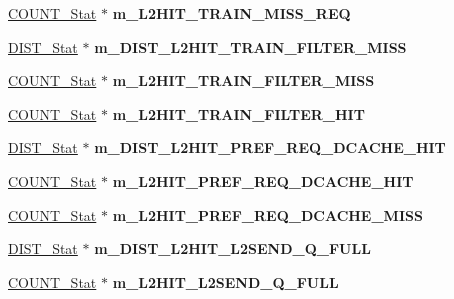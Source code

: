\begin{DoxyCompactItemize}
\item 
\hypertarget{classall__stats__c_a0ab7ad96cf461b0328bba168c20f0e55}{
\hyperlink{classCOUNT__Stat}{COUNT\_\-Stat} $\ast$ {\bfseries m\_\-L2HIT\_\-TRAIN\_\-MISS\_\-REQ}}
\label{classall__stats__c_a0ab7ad96cf461b0328bba168c20f0e55}

\item 
\hypertarget{classall__stats__c_a50313ff7202775c1bbafd9710139e45c}{
\hyperlink{classDIST__Stat}{DIST\_\-Stat} $\ast$ {\bfseries m\_\-DIST\_\-L2HIT\_\-TRAIN\_\-FILTER\_\-MISS}}
\label{classall__stats__c_a50313ff7202775c1bbafd9710139e45c}

\item 
\hypertarget{classall__stats__c_ae0bdb83b1c49fc2e2b6a925e9aaa6a6e}{
\hyperlink{classCOUNT__Stat}{COUNT\_\-Stat} $\ast$ {\bfseries m\_\-L2HIT\_\-TRAIN\_\-FILTER\_\-MISS}}
\label{classall__stats__c_ae0bdb83b1c49fc2e2b6a925e9aaa6a6e}

\item 
\hypertarget{classall__stats__c_af22043895987407b9ff977d757f1f85d}{
\hyperlink{classCOUNT__Stat}{COUNT\_\-Stat} $\ast$ {\bfseries m\_\-L2HIT\_\-TRAIN\_\-FILTER\_\-HIT}}
\label{classall__stats__c_af22043895987407b9ff977d757f1f85d}

\item 
\hypertarget{classall__stats__c_a007f642785b586d3118a0c32601fe599}{
\hyperlink{classDIST__Stat}{DIST\_\-Stat} $\ast$ {\bfseries m\_\-DIST\_\-L2HIT\_\-PREF\_\-REQ\_\-DCACHE\_\-HIT}}
\label{classall__stats__c_a007f642785b586d3118a0c32601fe599}

\item 
\hypertarget{classall__stats__c_a761eaa8bd472f3ca550d40f844aaab0d}{
\hyperlink{classCOUNT__Stat}{COUNT\_\-Stat} $\ast$ {\bfseries m\_\-L2HIT\_\-PREF\_\-REQ\_\-DCACHE\_\-HIT}}
\label{classall__stats__c_a761eaa8bd472f3ca550d40f844aaab0d}

\item 
\hypertarget{classall__stats__c_a0c8d6589d1d72e4eaa0827e3114cdc25}{
\hyperlink{classCOUNT__Stat}{COUNT\_\-Stat} $\ast$ {\bfseries m\_\-L2HIT\_\-PREF\_\-REQ\_\-DCACHE\_\-MISS}}
\label{classall__stats__c_a0c8d6589d1d72e4eaa0827e3114cdc25}

\item 
\hypertarget{classall__stats__c_a4af8f5d9e81fefc2d2f5a9464c3039e2}{
\hyperlink{classDIST__Stat}{DIST\_\-Stat} $\ast$ {\bfseries m\_\-DIST\_\-L2HIT\_\-L2SEND\_\-Q\_\-FULL}}
\label{classall__stats__c_a4af8f5d9e81fefc2d2f5a9464c3039e2}

\item 
\hypertarget{classall__stats__c_a62d6e744cf5f7bb2797a34cb03b1c5ab}{
\hyperlink{classCOUNT__Stat}{COUNT\_\-Stat} $\ast$ {\bfseries m\_\-L2HIT\_\-L2SEND\_\-Q\_\-FULL}}
\label{classall__stats__c_a62d6e744cf5f7bb2797a34cb03b1c5ab}


\end{DoxyCompactItemize}

